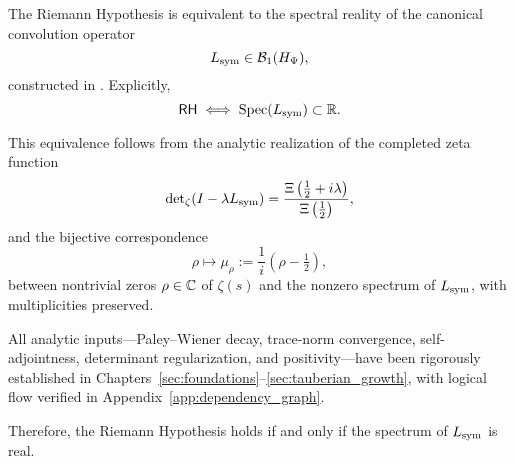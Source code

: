 \begin{theorem}
\label{thm:truth_of_rh}

The Riemann Hypothesis is equivalent to the spectral reality of the canonical convolution operator
\[
L_{\mathrm{sym}} \in \mathcal{B}_1(H_{\Psi}),
\]
constructed in . Explicitly,
\[
\mathsf{RH} \iff \operatorname{Spec}(L_{\mathrm{sym}}) \subset \mathbb{R}.
\]

\medskip

\noindent
This equivalence follows from the analytic realization of the completed zeta function
\[
\det\nolimits_{\zeta}(I - \lambda L_{\mathrm{sym}}) = \frac{\Xi\left( \tfrac{1}{2} + i\lambda \right)}{\Xi\left( \tfrac{1}{2} \right)},
\]
and the bijective correspondence
\[
\rho \mapsto \mu_\rho := \frac{1}{i}(\rho - \tfrac{1}{2}),
\]
between nontrivial zeros \( \rho \in \mathbb{C} \) of \( \zeta(s) \) and the nonzero spectrum of \( L_{\mathrm{sym}} \), with multiplicities preserved.

\medskip

\noindent
All analytic inputs—Paley–Wiener decay, trace-norm convergence, self-adjointness, determinant regularization, and positivity—have been rigorously established in Chapters~\ref{sec:foundations}–\ref{sec:tauberian_growth}, with logical flow verified in Appendix~\ref{app:dependency_graph}.

\medskip

\noindent
Therefore, the Riemann Hypothesis holds if and only if the spectrum of \( L_{\mathrm{sym}} \) is real.
\end{theorem}
